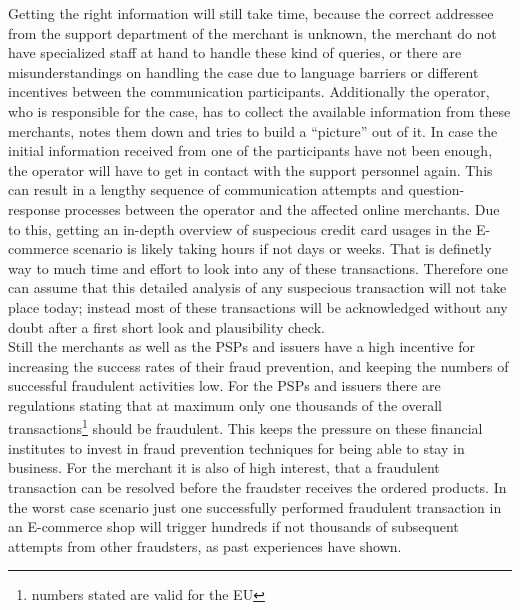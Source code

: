 Getting the right information will still take time, because the correct addressee from the support department of the merchant is unknown, the merchant do not have specialized staff at hand to handle these kind of queries, or there are misunderstandings on handling the case due to language barriers or different incentives between the communication participants. Additionally the operator, who is responsible for the case, has to collect the available information from these merchants, notes them down and tries to build a ``picture'' out of it. In case the initial information received from one of the participants have not been enough, the operator will have to get in contact with the support personnel again. This can result in a lengthy sequence of communication attempts and question-response processes between the operator and the affected online merchants. Due to this, getting an in-depth overview of suspecious credit card usages in the \gls{E-commerce} scenario is likely taking hours if not days or weeks. That is definetly way to much time and effort to look into any of these transactions. Therefore one can assume that this detailed analysis of any suspecious transaction will not take place today; instead most of these transactions will be acknowledged without any doubt after a first short look and plausibility check. \\

Still the merchants as well as the \gls{PSP}s and issuers have a high incentive for increasing the success rates of their fraud prevention, and keeping the numbers of successful fraudulent activities low. For the \gls{PSP}s and issuers there are regulations stating that at maximum only one thousands of the overall transactions\footnote{numbers stated are valid for the EU} should be fraudulent. This keeps the pressure on these financial institutes to invest in fraud prevention techniques for being able to stay in business. For the merchant it is also of high interest, that a fraudulent transaction can be resolved before the fraudster receives the ordered products. In the worst case scenario just one successfully performed fraudulent transaction in an \gls{E-commerce} shop will trigger hundreds if not thousands of subsequent attempts from other fraudsters, as past experiences have shown.


